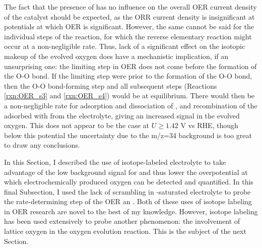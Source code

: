 The fact that the presence of  has no influence on the overall OER current density of the catalyst should be expected, as the ORR current density is insignificant at potentials at which OER is significant. However, the same cannot be said for the individual steps of the reaction, for which the reverse elementary reaction might occur at a non-negligible rate. Thus, lack of a significant effect on the isotopic makeup of the evolved oxygen does have a mechanistic implication, if an unsurprising one: the limiting step in OER does not come before the formation of the O-O bond. If the limiting step were prior to the formation of the O-O bond, then the O-O bond-forming step and all subsequent steps (Reactions \ref{rxn:OER_s3} and \ref{rxn:OER_s4}) would be at equilibrium. There would then be a non-negligible rate for adsorption and dissociation of , and recombination of the adsorbed  with  from the electrolyte, giving an increased  signal in the evolved oxygen. This does not appear to be the case at $U\ge1.42$ V vs RHE, though below this potential the uncertainty due to the m/z=34 background is too great to draw any conclusions. 

In this Section, I described the use of isotope-labeled electrolyte to take advantage of the low background signal for  and thus lower the overpotential at which electrochemically produced oxygen can be detected and quantified. In this final Subsection, I used the lack of scrambling in -saturated  electrolyte to probe the rate-determining step of the OER an . Both of these uses of isotope labeling in OER research are novel to the best of my knowledge. However, isotope labeling has been used extensively to probe another phenomenon: the involvement of lattice oxygen in the oxygen evolution reaction. This is the subject of the next Section.